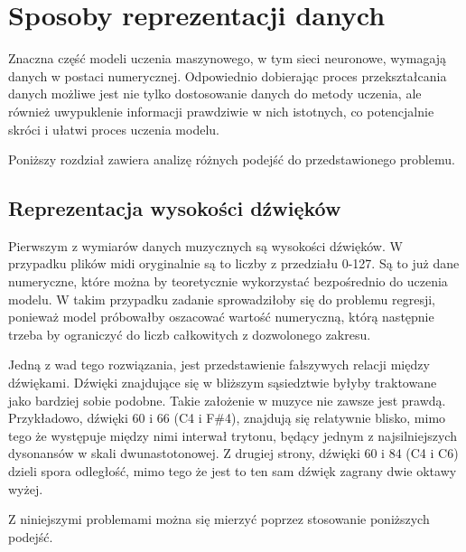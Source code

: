 \chapter{Sposoby reprezentacji danych}
{
    Znaczna część modeli uczenia maszynowego, w\,\,tym sieci neuronowe, wymagają 
    danych w\,\,postaci numerycznej. Odpowiednio dobierając proces przekształcania danych
    możliwe jest nie tylko dostosowanie danych do metody uczenia, ale również
    uwypuklenie informacji prawdziwie w\,\,nich istotnych, co potencjalnie skróci i\,\,ułatwi proces uczenia modelu.

    Poniższy rozdział zawiera analizę różnych podejść do przedstawionego problemu.

    \section{Reprezentacja wysokości dźwięków}
    {
        Pierwszym z\,\,wymiarów danych muzycznych są wysokości dźwięków. W\,\,przypadku plików midi
        oryginalnie są to liczby z\,\,przedziału 0-127. Są to już dane numeryczne, które
        można by teoretycznie wykorzystać bezpośrednio do uczenia modelu.
        W\,\,takim przypadku zadanie sprowadziłoby się do problemu regresji, ponieważ model próbowałby
        oszacować wartość numeryczną, którą następnie trzeba by ograniczyć do liczb całkowitych z\,\,dozwolonego zakresu.

        Jedną z\,\,wad tego rozwiązania, jest przedstawienie fałszywych relacji między dźwiękami.
        Dźwięki znajdujące się w\,\,bliższym sąsiedztwie byłyby traktowane jako bardziej sobie podobne.
        Takie założenie w\,\,muzyce nie zawsze jest prawdą. Przykładowo, dźwięki 60 i\,\,66 (C4 i\,\,F\#4), znajdują się
        relatywnie blisko, mimo tego że występuje między nimi interwał trytonu, będący jednym z\,\,najsilniejszych dysonansów w\,\,skali 
        dwunastotonowej. Z\,\,drugiej strony, dźwięki 60 i\,\,84 (C4 i\,\,C6) dzieli spora odległość, mimo tego że jest to ten sam dźwięk
        zagrany dwie oktawy wyżej.

        Z\,\,niniejszymi problemami można się mierzyć poprzez stosowanie poniższych podejść.

}}
